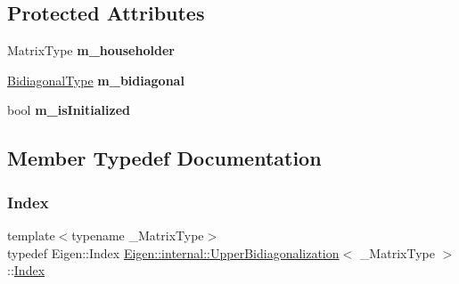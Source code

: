 \subsection*{Protected Attributes}
\begin{DoxyCompactItemize}
\item 
\mbox{\label{class_eigen_1_1internal_1_1_upper_bidiagonalization_a40d8ad9af770d519cf1f0c09db49817a}} 
Matrix\+Type {\bfseries m\+\_\+householder}
\item 
\mbox{\label{class_eigen_1_1internal_1_1_upper_bidiagonalization_ac9fe2868fd468ff98dad66127ae7a7c2}} 
\mbox{\hyperlink{class_eigen_1_1internal_1_1_band_matrix}{Bidiagonal\+Type}} {\bfseries m\+\_\+bidiagonal}
\item 
\mbox{\label{class_eigen_1_1internal_1_1_upper_bidiagonalization_ade33f99ca536721cf4ed69fe68f6dc95}} 
bool {\bfseries m\+\_\+is\+Initialized}
\end{DoxyCompactItemize}


\subsection{Member Typedef Documentation}
\mbox{\label{class_eigen_1_1internal_1_1_upper_bidiagonalization_adcb14f3919a3dcc9977ba6b8105087fe}} 
\subsubsection{\texorpdfstring{Index}{Index}}
{\footnotesize\ttfamily template$<$typename \+\_\+\+Matrix\+Type$>$ \\
typedef Eigen\+::\+Index \mbox{\hyperlink{class_eigen_1_1internal_1_1_upper_bidiagonalization}{Eigen\+::internal\+::\+Upper\+Bidiagonalization}}$<$ \+\_\+\+Matrix\+Type $>$\+::\mbox{\hyperlink{class_eigen_1_1internal_1_1_upper_bidiagonalization_adcb14f3919a3dcc9977ba6b8105087fe}{Index}}}

